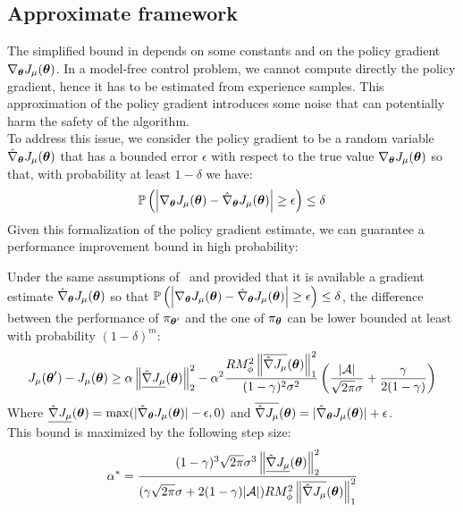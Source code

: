 \newcommand{\estgradj}{\hat{\nabla}_{\vtheta}J_\mu(\vtheta)}
\newcommand{\upgradj}{\overline{\hat{\nabla}J_\mu}(\vtheta)}
\newcommand{\botgradj}{\underline{\hat{\nabla}J_\mu}(\vtheta)}
\subsection{Approximate framework}
The simplified bound in  depends on some constants and on the policy gradient $\nabla_{{\boldsymbol{\theta}}}J_\mu({\boldsymbol{\theta}})$. In a model-free control problem, we cannot compute directly the policy gradient, hence it has to be estimated from experience samples. This approximation of the policy gradient introduces some noise that can potentially harm the safety of the algorithm.\\
To address this issue, we consider the policy gradient to be a random variable $\estgradj$ that has a bounded error $\epsilon$ with respect to the true value $\nabla_{{\boldsymbol{\theta}}}J_\mu({\boldsymbol{\theta}})$ so that, with probability at least $1-\delta$ we have:
\[
\mathbb{P}\left(\left|\gradj - \estgradj\right|\geq\epsilon\right)\leq\delta
\]
Given this formalization of the policy gradient estimate, we can guarantee a performance improvement bound in high probability:
\begin{theorem}
Under the same assumptions of~ and provided that it is available a gradient estimate $\estgradj$ so that $\mathbb{P}\left(\left|\gradj - \estgradj\right|\geq\epsilon\right)\leq\delta$, the difference between the performance of $\pi_{{\boldsymbol{\theta}}'}$ and the one of $\pi_{{\boldsymbol{\theta}}}$ can be lower bounded at least with probability $(1-\delta)^m$:
\[
J_\mu(\vtheta') - J_\mu(\vtheta) \geq \alpha\norm[2]{\botgradj}^2 - \alpha^2\frac{RM_\phi^2\norm[1]{\upgradj}^2}{(1-\gamma)^2\sigma^2}\left( \frac{|\aspace|}{\sqrt{2\pi}\sigma} + \frac{\gamma}{2(1-\gamma)} \right)
\]
Where $\botgradj=\max(|\estgradj|-\epsilon, 0)$ and $\upgradj=|\estgradj|+\epsilon$.\\
This bound is maximized by the following step size:
\[
\alpha^* = \frac{(1-\gamma)^3\sqrt{2\pi}\sigma^3\norm[2]{\botgradj}^2}{(\gamma\sqrt{2\pi}\sigma +2(1-\gamma)|\aspace|)RM_\phi^2\norm[1]{\upgradj}^2}
\]
\end{theorem}

